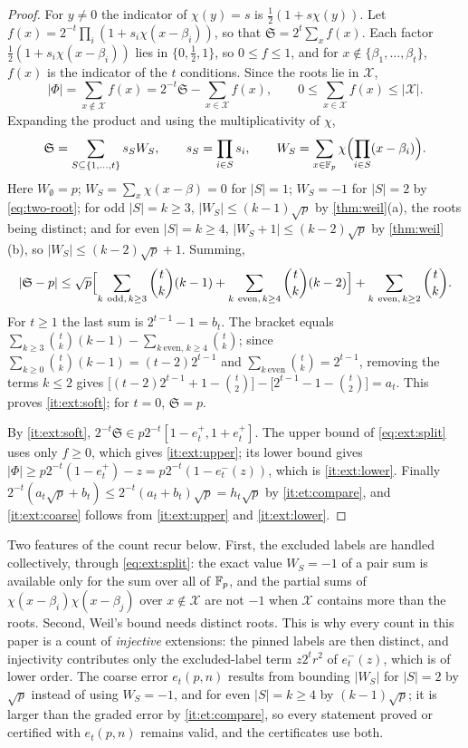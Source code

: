 \begin{proof}
For $y\ne0$ the indicator of $\chi(y)=s$ is $\frac12(1+s\chi(y))$. Let
$f(x)=2^{-t}\prod_i(1+s_i\chi(x-\beta_i))$, so that $\mathfrak S=2^t\sum_xf(x)$.
Each factor $\frac12(1+s_i\chi(x-\beta_i))$ lies in $\{0,\frac12,1\}$, so
$0\le f\le1$, and for $x\notin\{\beta_1,\dots,\beta_t\}$, $f(x)$ is the
indicator of the $t$ conditions. Since the roots lie in $\mathcal X$,
\begin{equation}\label{eq:ext:split}
 |\Phi|=\sum_{x\notin\mathcal X}f(x)=2^{-t}\mathfrak S-\sum_{x\in\mathcal X}f(x),
 \qquad 0\le\sum_{x\in\mathcal X}f(x)\le|\mathcal X| .
\end{equation}
Expanding the product and using the multiplicativity of $\chi$,
\[
 \mathfrak S=\sum_{S\subseteq\{1,\dots,t\}}s_SW_S,\qquad
 s_S=\prod_{i\in S}s_i,\qquad
 W_S=\sum_{x\in\mathbb F_p}\chi\Bigl(\prod_{i\in S}(x-\beta_i)\Bigr).
\]
Here $W_\emptyset=p$; $W_S=\sum_x\chi(x-\beta)=0$ for $|S|=1$; $W_S=-1$ for
$|S|=2$ by \eqref{eq:two-root}; for odd $|S|=k\ge3$, $|W_S|\le(k-1)\sqrt p$ by
\cref{thm:weil}\textup{(a)}, the roots being distinct; and for even $|S|=k\ge4$,
$|W_S+1|\le(k-2)\sqrt p$ by \cref{thm:weil}\textup{(b)}, so
$|W_S|\le(k-2)\sqrt p+1$. Summing,
\[
 |\mathfrak S-p|\le\sqrt p\Bigl[\sum_{k\ \mathrm{odd},\,k\ge3}\binom tk(k-1)
 +\sum_{k\ \mathrm{even},\,k\ge4}\binom tk(k-2)\Bigr]
 +\sum_{k\ \mathrm{even},\,k\ge2}\binom tk .
\]
For $t\ge1$ the last sum is $2^{t-1}-1=b_t$. The bracket equals
$\sum_{k\ge3}\binom tk(k-1)-\sum_{k\ \mathrm{even},\,k\ge4}\binom tk$; since
$\sum_{k\ge0}\binom tk(k-1)=(t-2)2^{t-1}$ and
$\sum_{k\ \mathrm{even}}\binom tk=2^{t-1}$, removing the terms $k\le2$ gives
$\bigl[(t-2)2^{t-1}+1-\binom t2\bigr]-\bigl[2^{t-1}-1-\binom t2\bigr]=a_t$. This
proves \ref{it:ext:soft}; for $t=0$, $\mathfrak S=p$.

By \ref{it:ext:soft}, $2^{-t}\mathfrak S\in p2^{-t}[1-e^+_t,1+e^+_t]$. The
upper bound of \eqref{eq:ext:split} uses only $f\ge0$, which gives
\ref{it:ext:upper}; its lower bound gives
$|\Phi|\ge p2^{-t}(1-e^+_t)-z=p2^{-t}(1-e^-_t(z))$, which is \ref{it:ext:lower}.
Finally $2^{-t}(a_t\sqrt p+b_t)\le2^{-t}(a_t+b_t)\sqrt p=h_t\sqrt p$ by
\ref{it:et:compare}, and \ref{it:ext:coarse} follows from \ref{it:ext:upper}
and \ref{it:ext:lower}.
\end{proof}

Two features of the count recur below. First, the excluded labels are handled
collectively, through \eqref{eq:ext:split}: the exact value $W_S=-1$ of a pair
sum is available only for the sum over all of $\mathbb F_p$, and the partial sums of
$\chi(x-\beta_i)\chi(x-\beta_j)$ over $x\notin\mathcal X$ are not $-1$ when
$\mathcal X$ contains more than the roots. Second, Weil's bound needs distinct
roots. This is why every count in this paper is a count of \emph{injective}
extensions: the pinned labels are then distinct, and injectivity contributes only the excluded-label term $z2^tr^2$ of $e^-_t(z)$, which is of lower order.
The coarse error $e_t(p,n)$ results from bounding $|W_S|$ for $|S|=2$ by $\sqrt p$ instead of using $W_S=-1$, and for even $|S|=k\ge4$ by $(k-1)\sqrt p$; it is larger than the graded error by
\ref{it:et:compare}, so every statement proved or certified with $e_t(p,n)$
remains valid, and the certificates use both.

